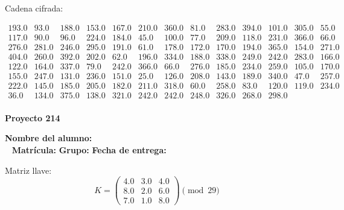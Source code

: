 \documentclass[12pt]{article}
\begin{document}
Cadena cifrada:
\begin{center}
$\begin{array}{lllllllllllll}
193.0 & 93.0 & 188.0 & 153.0 & 167.0 & 210.0 & 360.0 & 81.0 & 283.0 & 394.0 & 101.0 & 305.0 & 55.0\\
117.0 & 90.0 & 96.0 & 224.0 & 184.0 & 45.0 & 100.0 & 77.0 & 209.0 & 118.0 & 231.0 & 366.0 & 66.0\\
276.0 & 281.0 & 246.0 & 295.0 & 191.0 & 61.0 & 178.0 & 172.0 & 170.0 & 194.0 & 365.0 & 154.0 & 271.0\\
404.0 & 260.0 & 392.0 & 202.0 & 62.0 & 196.0 & 334.0 & 188.0 & 338.0 & 249.0 & 242.0 & 283.0 & 166.0\\
122.0 & 164.0 & 337.0 & 79.0 & 242.0 & 366.0 & 66.0 & 276.0 & 185.0 & 234.0 & 259.0 & 105.0 & 170.0\\
155.0 & 247.0 & 131.0 & 236.0 & 151.0 & 25.0 & 126.0 & 208.0 & 143.0 & 189.0 & 340.0 & 47.0 & 257.0\\
222.0 & 145.0 & 185.0 & 205.0 & 182.0 & 211.0 & 318.0 & 60.0 & 258.0 & 83.0 & 120.0 & 119.0 & 234.0\\
36.0 & 134.0 & 375.0 & 138.0 & 321.0 & 242.0 & 242.0 & 248.0 & 326.0 & 268.0 & 298.0\\
\end{array}$
\end{center}

\newpage


\textbf{Proyecto 214}

\textbf{Nombre del alumno:} \underline{\hspace{13cm}}\\\
\vspace{1cm}
\textbf{Matrícula:} \underline{\hspace{4cm}} \hspace{1cm}
\textbf{Grupo:} \underline{\hspace{2cm}}
\textbf{Fecha de entrega:} \underline{\hspace{2cm}}

\medskip

Matriz llave:
\[
K = \begin{pmatrix}
4.0 & 3.0 & 4.0\\
8.0 & 2.0 & 6.0\\
7.0 & 1.0 & 8.0
\end{pmatrix} \pmod{29}
\]
\end{document}
